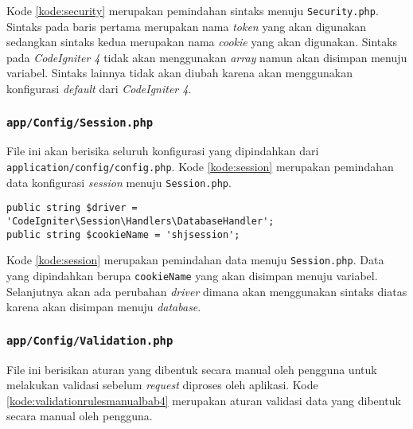 Kode \ref{kode:security} merupakan pemindahan sintaks menuju \texttt{Security.php}. Sintaks pada baris pertama merupakan nama \textit{token} yang akan digunakan sedangkan sintaks kedua merupakan nama \textit{cookie} yang akan digunakan. Sintaks pada \textit{CodeIgniter 4} tidak akan menggunakan \textit{array} namun akan disimpan menuju variabel. Sintaks lainnya tidak akan diubah karena akan menggunakan konfigurasi \textit{default} dari \textit{CodeIgniter 4}.

\subsubsection{\texttt{app/Config/Session.php}}
File ini akan berisika seluruh konfigurasi yang dipindahkan dari \texttt{application/config/config.php}. Kode \ref{kode:session} merupakan pemindahan data konfigurasi \textit{session} menuju \texttt{Session.php}.
\begin{lstlisting}[caption=Pemindahan file \textit{config} menuju \textit{Session}, label=kode:session]
public string $driver = 'CodeIgniter\Session\Handlers\DatabaseHandler';
public string $cookieName = 'shjsession';
\end{lstlisting}

Kode \ref{kode:session} merupakan pemindahan data menuju \texttt{Session.php}. Data yang dipindahkan berupa \texttt{cookieName} yang akan disimpan menuju variabel. Selanjutnya akan ada perubahan \textit{driver} dimana akan menggunakan sintaks diatas karena akan disimpan menuju \textit{database}.

\subsubsection{\texttt{app/Config/Validation.php}}
\label{subsubsec:validationbab4}
File ini berisikan aturan yang dibentuk secara manual oleh pengguna untuk melakukan validasi sebelum \textit{request} diproses oleh aplikasi. Kode \ref{kode:validationrulesmanualbab4} merupakan aturan validasi data yang dibentuk secara manual oleh pengguna.


